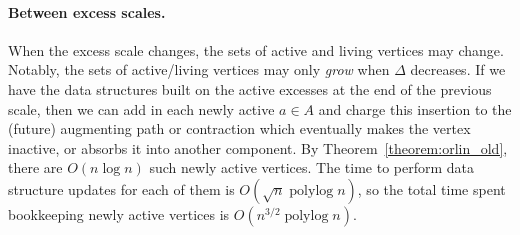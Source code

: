 \documentclass[11pt]{article}
\def\polylog{\mathop{\mathrm{polylog}}}
\theoremstyle{plain}
\numberwithin{figure}{section}
\begin{document}
\paragraph{Between excess scales.}
When the excess scale changes, the sets of active and living vertices may
change.
Notably, the sets of active/living vertices may only \emph{grow} when $\Delta$
decreases.
If we have the data structures built on the active excesses at the end of the
previous scale, then we can add in each newly active $a \in A$ and
charge this insertion to the (future) augmenting path or contraction which
eventually makes the vertex inactive, or absorbs it into another component.
By Theorem~\ref{theorem:orlin_old}, there are $O(n\log n)$ such newly active
vertices.
The time to perform data structure updates for each of them is
$O(\sqrt{n}\polylog n)$, so the total time spent bookkeeping newly active
vertices is $O(n^{3/2}\polylog n)$.

{


}
\end{document}
